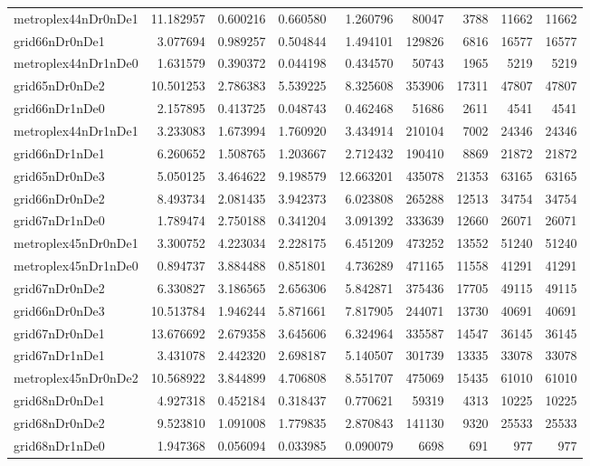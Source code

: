 \documentclass[../../../thesis.tex]{subfiles}
\begin{document}
\begin{longtable}{|l|r|r|r|r|r|r|r|r|}
metroplex44nDr0nDe1 & 11.182957 & 0.600216 & 0.660580 & 1.260796 & 80047 & 3788 & 11662 & 11662 \\
grid66nDr0nDe1 & 3.077694 & 0.989257 & 0.504844 & 1.494101 & 129826 & 6816 & 16577 & 16577 \\
metroplex44nDr1nDe0 & 1.631579 & 0.390372 & 0.044198 & 0.434570 & 50743 & 1965 & 5219 & 5219 \\
grid65nDr0nDe2 & 10.501253 & 2.786383 & 5.539225 & 8.325608 & 353906 & 17311 & 47807 & 47807 \\
grid66nDr1nDe0 & 2.157895 & 0.413725 & 0.048743 & 0.462468 & 51686 & 2611 & 4541 & 4541 \\
metroplex44nDr1nDe1 & 3.233083 & 1.673994 & 1.760920 & 3.434914 & 210104 & 7002 & 24346 & 24346 \\
grid66nDr1nDe1 & 6.260652 & 1.508765 & 1.203667 & 2.712432 & 190410 & 8869 & 21872 & 21872 \\
grid65nDr0nDe3 & 5.050125 & 3.464622 & 9.198579 & 12.663201 & 435078 & 21353 & 63165 & 63165 \\
grid66nDr0nDe2 & 8.493734 & 2.081435 & 3.942373 & 6.023808 & 265288 & 12513 & 34754 & 34754 \\
grid67nDr1nDe0 & 1.789474 & 2.750188 & 0.341204 & 3.091392 & 333639 & 12660 & 26071 & 26071 \\
metroplex45nDr0nDe1 & 3.300752 & 4.223034 & 2.228175 & 6.451209 & 473252 & 13552 & 51240 & 51240 \\
metroplex45nDr1nDe0 & 0.894737 & 3.884488 & 0.851801 & 4.736289 & 471165 & 11558 & 41291 & 41291 \\
grid67nDr0nDe2 & 6.330827 & 3.186565 & 2.656306 & 5.842871 & 375436 & 17705 & 49115 & 49115 \\
grid66nDr0nDe3 & 10.513784 & 1.946244 & 5.871661 & 7.817905 & 244071 & 13730 & 40691 & 40691 \\
grid67nDr0nDe1 & 13.676692 & 2.679358 & 3.645606 & 6.324964 & 335587 & 14547 & 36145 & 36145 \\
grid67nDr1nDe1 & 3.431078 & 2.442320 & 2.698187 & 5.140507 & 301739 & 13335 & 33078 & 33078 \\
metroplex45nDr0nDe2 & 10.568922 & 3.844899 & 4.706808 & 8.551707 & 475069 & 15435 & 61010 & 61010 \\
grid68nDr0nDe1 & 4.927318 & 0.452184 & 0.318437 & 0.770621 & 59319 & 4313 & 10225 & 10225 \\
grid68nDr0nDe2 & 9.523810 & 1.091008 & 1.779835 & 2.870843 & 141130 & 9320 & 25533 & 25533 \\
grid68nDr1nDe0 & 1.947368 & 0.056094 & 0.033985 & 0.090079 & 6698 & 691 & 977 & 977 \\

\end{longtable}
\end{document}
